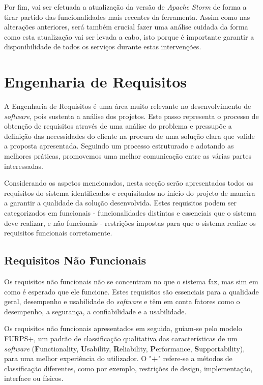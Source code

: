 Por fim, vai ser efetuada a atualização da versão de \textit{Apache Storm} de forma a tirar partido
das funcionalidades mais recentes da ferramenta. Assim como nas alterações anteriores, será também
crucial fazer uma análise cuidada da forma como esta atualização vai ser levada a cabo, isto porque
é importante garantir a disponibilidade de todos os serviços durante estas intervenções. 


\section{Engenharia de Requisitos}

A Engenharia de Requisitos é uma área muito relevante no desenvolvimento de \textit{software}, pois 
sustenta a análise dos projetos. Este passo representa o processo de obtenção de requisitos através 
de uma análise do problema e pressupõe a definição das necessidades do cliente na procura de uma 
solução clara que valide a proposta apresentada. Seguindo um processo estruturado e adotando as 
melhores práticas, promovemos uma melhor comunicação entre as várias partes interessadas.

Considerando os aspetos mencionados, nesta secção serão apresentados todos os 
requisitos do sistema identificados e requisitados no início do projeto de maneira a garantir a 
qualidade da solução desenvolvida. Estes requisitos podem ser categorizados em funcionais - 
funcionalidades distintas e essenciais que o sistema deve realizar, e não funcionais - 
restrições impostas para que o sistema realize os requisitos funcionais corretamente.

\subsection{Requisitos Não Funcionais}

Os requisitos não funcionais não se concentram no que o sistema faz, mas sim em como é esperado que
ele funcione. Estes requisitos são essenciais para a qualidade geral, desempenho e usabilidade do 
\textit{software} e têm em conta fatores como o desempenho, a segurança, a confiabilidade e a 
usabilidade.

Os requisitos não funcionais apresentados em seguida, guiam-se pelo modelo FURPS+, um padrão de 
classificação qualitativa das características de um \textit{software} (\textbf{F}unctionality, 
\textbf{U}sability, \textbf{R}eliability, \textbf{P}erformance, \textbf{S}upportability), para uma 
melhor experiência do utilizador. O "\textbf{+}" refere-se a métodos de classificação diferentes, 
como por exemplo, restrições de design, implementação, interface ou físicos.

